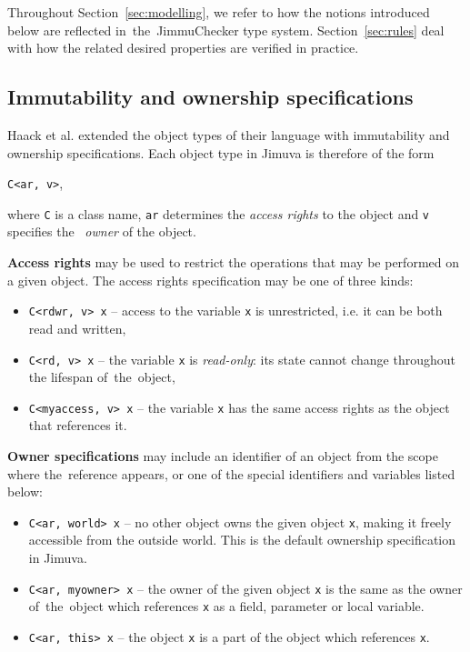 \documentclass{pracamgr}
\theoremstyle{break}
\theoremstyle{break}
\theoremstyle{break}
\begin{document}
Throughout Section~\ref{sec:modelling}, we refer to how the notions
introduced below are reflected in~the~JimmuChecker type
system. Section~\ref{sec:rules} deal with how the related desired
properties are verified in practice.

\subsection{Immutability and ownership specifications}
\label{subsec:imm-spec}

Haack et al. extended the object types of their language with
immutability and ownership specifications. Each object type in Jimuva
is therefore of the form
\begin{center}
  \texttt{C<ar, v>},
\end{center}
where \texttt{C} is a class name, \texttt{ar} determines the
\emph{access rights} to the object and \texttt{v} specifies the~
\emph{owner} of the object.

\textbf{Access rights} may be used to restrict the operations that
may be performed on a given object. The access rights specification
may be one of three kinds:
\begin{itemize}
\item \texttt{C<rdwr, v> x} -- access to the variable \texttt{x} is
  unrestricted, i.e. it can be both read and written,
\item \texttt{C<rd, v> x} -- the variable \texttt{x} is
  \emph{read-only}: its state cannot change throughout the lifespan
  of~the~ob\-ject, 
\item \texttt{C<myaccess, v> x} -- the variable \texttt{x} has the
  same access rights as the object that references it.
\end{itemize}

\textbf{Owner specifications} may include an identifier of an object from the
scope where the~re\-fe\-ren\-ce appears, or one of the special identifiers
and variables listed below:
\begin{itemize}
\item \texttt{C<ar, world> x} -- no other object owns the given object
  \texttt{x}, making it freely accessible from the outside world. This
  is the default ownership specification in Jimuva.
\item \texttt{C<ar, myowner> x} -- the owner of the given object
  \texttt{x} is the same as the owner of~the~object which references
  \texttt{x} as a field, parameter or local variable.
\item \texttt{C<ar, this> x} -- the object \texttt{x} is a part of the 
  object which references \texttt{x}. 
\end{itemize}
\end{document}

